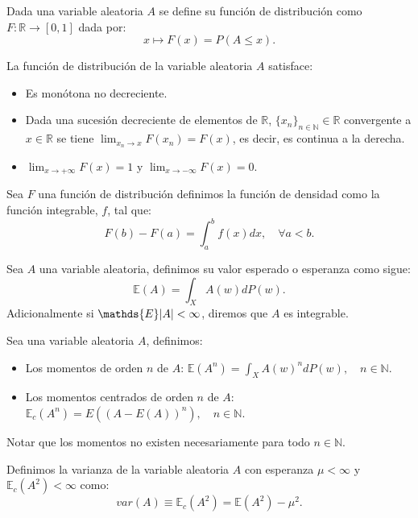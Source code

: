 \documentclass[../proyecto.tex]{memoir}
\begin{document}
\begin{defi}
Dada una variable aleatoria $A$ se define su función de distribución como $ F : \mathds{R} \to [0,1] $ dada por:
$$
x \mapsto F(x)=P(A \leq x).
$$
\end{defi}

\begin{prop}
La función de distribución de la variable aleatoria $A$ satisface:
\begin{itemize}
\item Es monótona no decreciente.
\item Dada una sucesión decreciente de elementos de $\mathds{R}$, $\{x_n\}_{n \in \mathds{N}} \in \mathds{R}$ convergente a $x\in \mathds{R}$ se tiene $\lim_{x_n \to x} F(x_n) = F(x)$, es decir, es continua a la derecha.
\item $\lim_{x\to+\infty} F(x) = 1$ y $\lim_{x\to-\infty} F(x) = 0$.
\end{itemize}
\end{prop}

\begin{defi}
Sea $F$ una función de distribución definimos la función de densidad como la función integrable, $f$, tal que:
$$
F(b)-F(a) = \int^{b}_a f(x) dx, \quad \forall a < b. 
$$
\end{defi}

\begin{defi}
Sea $A$ una variable aleatoria, definimos su valor esperado o esperanza como sigue:
$$
\mathds{E}(A) = \int_{X}A(w)dP(w).
$$
Adicionalmente si $\mathds{E}\abs{A} < \infty$, diremos que $A$ es integrable.
\end{defi}

\begin{defi}
Sea una variable aleatoria $A$, definimos:
\begin{itemize}
\item Los momentos de orden $n$ de $A$: $\mathds{E}(A^n) = \int_{X}A(w)^{n}dP(w), \quad n \in \mathds{N}$.
\item Los momentos centrados de orden $n$ de $A$: $\mathds{E}_c(A^n) = E( (A-E(A))^n ), \quad n \in \mathds{N}$.
\end{itemize}
\end{defi}

Notar que los momentos no existen necesariamente para todo $n\in \mathds{N}$.

\begin{defi}
Definimos la varianza de la variable aleatoria $A$ con esperanza $\mu < \infty$ y $\mathds{E}_c(A^2) < \infty $ como:$$
var(A) \equiv \mathds{E}_c(A^2) = \mathds{E}(A^2) - \mu^2.
$$
\end{defi}
\end{document}

